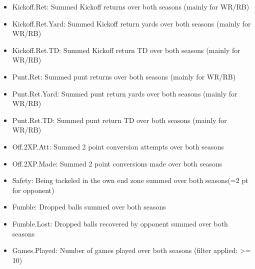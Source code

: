\documentclass[]{article}
\begin{document}
\begin{itemize}
\item
  Kickoff.Ret: Summed Kickoff returns over both seasons (mainly for
  WR/RB)
\item
  Kickoff.Ret.Yard: Summed Kickoff return yards over both seasons
  (mainly for WR/RB)
\item
  Kickoff.Ret.TD: Summed Kickoff return TD over both seasons (mainly for
  WR/RB)
\item
  Punt.Ret: Summed punt returns over both seasons (mainly for WR/RB)
\item
  Punt.Ret.Yard: Summed punt return yards over both seasons (mainly for
  WR/RB)
\item
  Punt.Ret.TD: Summed punt return TD over both seasons (mainly for
  WR/RB)
\item
  Off.2XP.Att: Summed 2 point conversion attempts over both seasons
\item
  Off.2XP.Made: Summed 2 point conversions made over both seasons
\item
  Safety: Being tackeled in the own end zone summed over both seasons(=2
  pt for opponent)
\item
  Fumble: Dropped balls summed over both seasons
\item
  Fumble.Lost: Dropped balls recovered by opponent summed over both
  seasons
\item
  Games.Played: Number of games played over both seasons (filter
  applied: \textgreater= 10)
\end{itemize}
\end{document}
